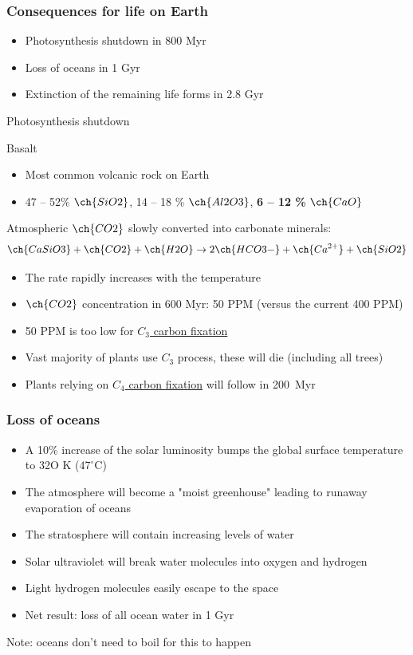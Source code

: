 \documentclass[aspectratio=169]{beamer}
\begin{document}
\begin{frame}
\frametitle{Consequences for life on Earth}

\begin{itemize}
\item{Photosynthesis shutdown in 800 Myr}
\item{Loss of oceans in 1 Gyr}
\item{Extinction of the remaining life forms in 2.8 Gyr}
\end{itemize}
\end{frame}


\begin{frame}{Photosynthesis shutdown}
\begin{block}{Basalt}
\begin{itemize}
\item Most common volcanic rock on Earth
\item 47 -- 52\% $\ch{SiO2}$, 14 -- 18 \% $\ch{Al2O3}$, {\bf 6 -- 12 \%} $\ch{CaO}$
\end{itemize}
\end{block}
Atmospheric $\ch{CO2}$ slowly converted into carbonate minerals:
\begin{displaymath}
\nonumber
\ch{CaSiO3} + \ch{CO2} + \ch{H2O} \to 2 \ch{HCO3-} + \ch{Ca^{2+}} + \ch{SiO2}
\end{displaymath}

\begin{itemize}
\item The rate rapidly increases with the temperature
\item $\ch{CO2}$ concentration in 600 Myr: 50 PPM \cite{arXiv:0912.2482} (versus the current 400 PPM)
\item 50 PPM is too low for \href{http://en.wikipedia.org/wiki/C3_carbon_fixation}{$C_3$ carbon fixation}
\item Vast majority of plants use $C_3$ process, these will die (including all trees)
\item Plants relying on \href{http://en.wikipedia.org/wiki/C4_carbon_fixation}{$C_4$ carbon fixation} will follow in 200~Myr
\end{itemize}
\end{frame}


\begin{frame}
\frametitle{Loss of oceans}
\begin{itemize}
\item A 10\% increase of the solar luminosity bumps the global surface temperature to 32O K ($47^\circ \mathrm{C}$)
\item The atmosphere will become a "moist greenhouse" leading to runaway
  evaporation of oceans \cite{James F. Kasting}
\item The stratosphere will contain increasing levels of water
\item Solar ultraviolet will break water molecules into oxygen and hydrogen
\item Light hydrogen molecules easily escape to the space
\item Net result: loss of all ocean water in 1 Gyr
\end{itemize}

Note: oceans don't need to boil for this to happen
\end{frame}
\end{document}
